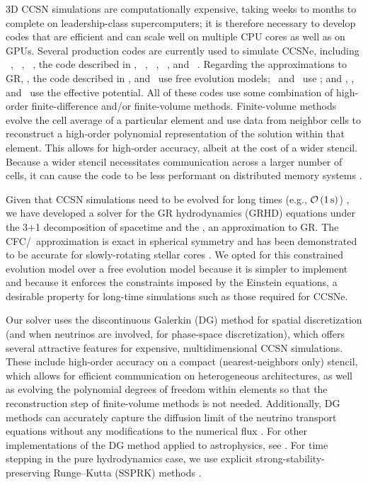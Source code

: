 3D CCSN simulations are computationally expensive,
taking weeks to months to complete
on leadership-class supercomputers; it is therefore
necessary to develop codes that are efficient and can scale well on
multiple CPU cores as well as on GPUs.
Several production codes are currently used to simulate CCSNe, including
\flashx\ \citep{for2000},
\cocov\ \citep{mjd2010},
\zelmani\ \citep{oao2012},
the code described in \citet{ktk2016},
\fornax\ \citep{sdb2019},
\nadafld\ \citep{rjj2019},
\chimera\ \citep{bbh2020},
and \gmunu\ \citep{cht2023}.
Regarding the approximations to GR, \zelmani, the code described in
\citet{ktk2016}, and \nadafld\ use free evolution models;
\cocov\ and \gmunu\ use \xcfc;
and \fornax, \chimera, and \flashx\ use the effective potential.
All of these codes use some combination of high-order finite-difference
and/or finite-volume methods.
Finite-volume methods \citep[e.g., see][]{l2002} evolve the cell average
of a particular element and use data from neighbor cells to reconstruct
a high-order polynomial representation of the solution within that element.
This allows for high-order accuracy, albeit at the cost of a wider stencil.
Because a wider stencil necessitates communication across a larger number of
cells, it can cause the code to be less performant on distributed memory systems
\citeme.

Given that CCSN simulations need to be evolved for long times
(e.g., $\mathcal{O}\left(1\,\mathrm{s}\right)$)
\citeme, we have developed a
solver for the GR hydrodynamics (GRHD) equations under the 3+1
decomposition of spacetime and the \xcfc, an approximation to GR.
The CFC/\xcfc\ approximation is exact in spherical
symmetry and has been demonstrated to be accurate for slowly-rotating stellar
cores \citep{dfm2002,mjd2010}.
We opted for this constrained evolution model over a free evolution model
because it is simpler to implement and because it enforces the constraints
imposed by the Einstein equations,
a desirable property for long-time simulations such as those
required for CCSNe.

Our solver uses the discontinuous Galerkin (DG) method for spatial
discretization (and when neutrinos are involved, for phase-space discretization),
which offers several attractive features for expensive,
multidimensional CCSN simulations.
These include high-order accuracy on a compact (nearest-neighbors only)
stencil, which allows for efficient communication on heterogeneous
architectures, as well as evolving the polynomial degrees of freedom
within elements so that the reconstruction step of finite-volume methods
is not needed.
Additionally, DG methods can accurately capture the diffusion limit of the
neutrino transport equations without any modifications to the numerical flux
\citeme.
For other implementations of the DG method applied to astrophysics,
see \citet{sbc2015,kff2017}.
For time stepping in the pure hydrodynamics case, we use
explicit strong-stability-preserving Runge--Kutta (SSPRK) methods
\citep[e.g., see][]{gst2001}.

